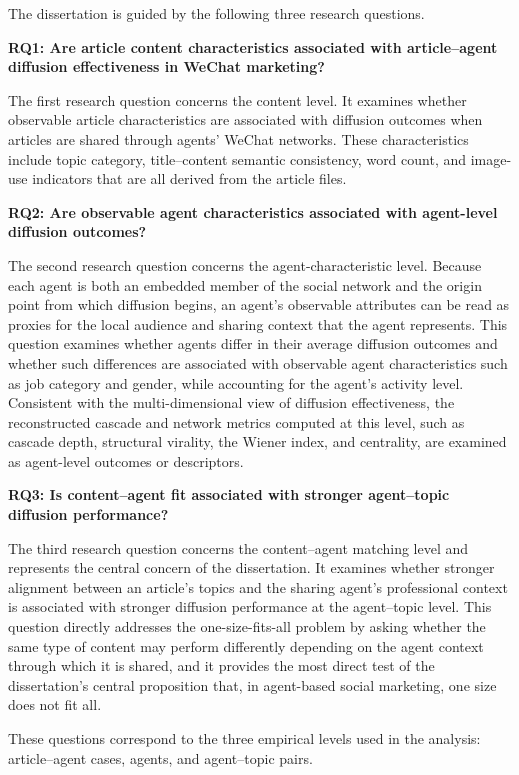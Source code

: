 The dissertation is guided by the following three research questions.

\noindent \textbf{RQ1: Are article content characteristics associated with article–agent diffusion effectiveness in WeChat marketing?}

The first research question concerns the content level. It examines whether observable article characteristics are associated with diffusion outcomes when articles are shared through agents' WeChat networks. These characteristics include topic category, title–content semantic consistency, word count, and image-use indicators that are all derived from the article files.

\noindent \textbf{RQ2: Are observable agent characteristics associated with agent-level diffusion outcomes?}

The second research question concerns the agent-characteristic level. Because each agent is both an embedded member of the social network and the origin point from which diffusion begins, an agent's observable attributes can be read as proxies for the local audience and sharing context that the agent represents. This question examines whether agents differ in their average diffusion outcomes and whether such differences are associated with observable agent characteristics such as job category and gender, while accounting for the agent's activity level. Consistent with the multi-dimensional view of diffusion effectiveness, the reconstructed cascade and network metrics computed at this level, such as cascade depth, structural virality, the Wiener index, and centrality, are examined as agent-level outcomes or descriptors.

\noindent \textbf{RQ3: Is content–agent fit associated with stronger agent–topic diffusion performance?}

The third research question concerns the content–agent matching level and represents the central concern of the dissertation. It examines whether stronger alignment between an article's topics and the sharing agent's professional context is associated with stronger diffusion performance at the agent–topic level. This question directly addresses the one-size-fits-all problem by asking whether the same type of content may perform differently depending on the agent context through which it is shared, and it provides the most direct test of the dissertation's central proposition that, in agent-based social marketing, one size does not fit all.

These questions correspond to the three empirical levels used in the analysis: article–agent cases, agents, and agent–topic pairs.

